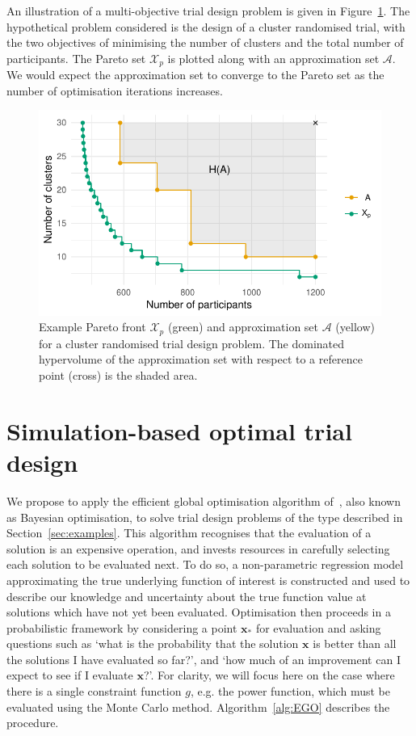 \documentclass{article} %
\begin{document}
An illustration of a multi-objective trial design problem is given in Figure~\ref{fig:fake_pareto}. The hypothetical problem considered is the design of a cluster randomised trial, with the two objectives of minimising the number of clusters and the total number of participants. The Pareto set $\mathcal{X}_{p}$ is plotted along with an approximation set $\mathcal{A}$. We would expect the approximation set to converge to the Pareto set as the number of optimisation iterations increases.

\begin{figure}
\centering
\includegraphics[scale=0.8]{./Figures/fake_pareto}
\caption{Example Pareto front $\mathcal{X}_{p}$ (green) and approximation set $\mathcal{A}$ (yellow) for a cluster randomised trial design problem. The dominated hypervolume of the approximation set with respect to a reference point (cross) is the shaded area.}
\label{fig:fake_pareto}
\end{figure}


\section{Simulation-based optimal trial design}\label{sec:methods}

We propose to apply the efficient global optimisation algorithm of~\cite{Jones1998}, also known as Bayesian optimisation, to solve trial design problems of the type described in Section~\ref{sec:examples}. This algorithm recognises that the evaluation of a solution is an expensive operation, and invests resources in carefully selecting each solution to be evaluated next. To do so, a non-parametric regression model approximating the true underlying function of interest is constructed and used to describe our knowledge and uncertainty about the true function value at solutions which have not yet been evaluated. Optimisation then proceeds in a probabilistic framework by considering a point $\textbf{x}_{*}$ for evaluation and asking questions such as `what is the probability that the solution $\textbf{x}$ is better than all the solutions I have evaluated so far?', and `how much of an improvement can I expect to see if I evaluate $\textbf{x}$?'. For clarity, we will focus here on the case where there is a single constraint function $g$, e.g. the power function, which must be evaluated using the Monte Carlo method. Algorithm~\ref{alg:EGO} describes the procedure.
\end{document}
